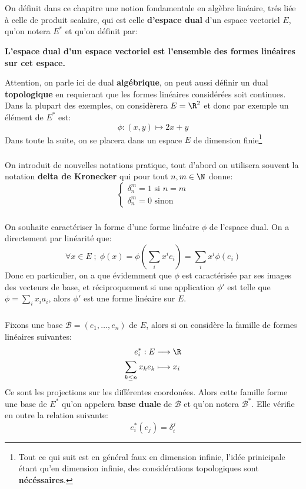 \chapter*{}
On définit dans ce chapitre une notion fondamentale en algèbre linéaire, trés liée à celle de produit scalaire, qui est celle \textbf{d'espace dual} d'un espace vectoriel \(E\), qu'on notera \(E^*\) et qu'on définit par:
\begin{center}
   \textbf{L'espace dual d'un espace vectoriel est l'ensemble des formes linéaires sur cet espace.}
\end{center}
Attention, on parle ici de dual \textbf{algébrique}, on peut aussi définir un dual \textbf{topologique} en requierant que les formes linéaires considérées soit continues. Dans la plupart des exemples, on considèrera \(E = \R^2\) et donc par exemple un élément de \(E^*\) est:
\[
   \phi : (x, y) \mapsto 2x + y   
\]
Dans toute la suite, on se placera dans un espace \(E\) de dimension finie\footnote[1]{Tout ce qui suit est en général faux en dimension infinie, l'idée prinicipale étant qu'en dimension infinie, des considérations topologiques sont \textbf{nécéssaires}.}

\subsection*{}
On introduit de nouvelles notations pratique, tout d'abord on utilisera souvent la notation \textbf{delta de Kronecker} qui pour tout \(n, m \in \N\) donne:
\[
   \begin{cases}
      \delta_{n}^m = 1 \text{ si } n = m\\
      \delta_{n}^m = 0 \text{ sinon }
   \end{cases}
\]
\subsection*{}
On souhaite caractériser la forme d'une forme linéaire \(\phi\) de l'espace dual. On a directement par linéarité que:
\[
   \forall x \in E \; ; \; \phi(x) = \phi\left(\sum_{i}x^ie_i\right) = \sum_{i}x^i\phi(e_i)  
\]
Donc en particulier, on a que évidemment que \(\phi\) est caractérisée par ses images des vecteurs de base, et réciproquement si une application \(\phi'\) est telle que \(\phi = \sum_{i}x_ia_i\), alors \(\phi'\) est une forme linéaire sur \(E\).
\subsection*{}
Fixons une base \(\mathscr{B} = (e_1, \ldots, e_n)\) de \(E\), alors si on considère la famille de formes linéaires suivantes:
\[
   \begin{aligned}
      e_i^* : E &\longrightarrow \R \\
      \sum_{k \leq n}x_ke_k &\longmapsto x_i
   \end{aligned}
\]
Ce sont les projections sur les différentes coordonées. Alors cette famille forme une base de \(E^*\) qu'on appelera \textbf{base duale} de \(\mathscr{B}\) et qu'on notera \(\mathscr{B}^*\). Elle vérifie en outre la relation suivante:
\[
   e_i^*(e_j) = \delta_{i}^j
\]
